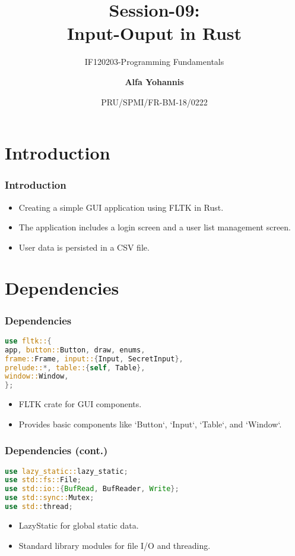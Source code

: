 \documentclass[aspectratio=169, table]{beamer}
\subtitle{IF120203-Programming Fundamentals}
\title{Session-09:\\\LARGE{Input-Ouput in Rust}\\ \vspace{10pt}}
\date[Serial]{\scriptsize {PRU/SPMI/FR-BM-18/0222}}
\author[Pradita]{\small{\textbf{Alfa Yohannis}}}
\begin{document}
\frame{\titlepage}

\begin{frame}
\tableofcontents
\end{frame}

\section{Introduction}
\begin{frame}
\frametitle{Introduction}
\begin{itemize}
\item Creating a simple GUI application using FLTK in Rust.
\item The application includes a login screen and a user list management screen.
\item User data is persisted in a CSV file.
\end{itemize}
\end{frame}

\section{Dependencies}
\begin{frame}[fragile]
\frametitle{Dependencies}
\begin{lstlisting}[language=Rust]
use fltk::{
app, button::Button, draw, enums,
frame::Frame, input::{Input, SecretInput},
prelude::*, table::{self, Table},
window::Window,
};
\end{lstlisting}
\begin{itemize}
\item FLTK crate for GUI components.
\item Provides basic components like `Button`, `Input`, `Table`, and `Window`.
\end{itemize}
\end{frame}

\begin{frame}[fragile]
\frametitle{Dependencies (cont.)}
\begin{lstlisting}[language=Rust]
use lazy_static::lazy_static;
use std::fs::File;
use std::io::{BufRead, BufReader, Write};
use std::sync::Mutex;
use std::thread;
\end{lstlisting}
\begin{itemize}
\item LazyStatic for global static data.
\item Standard library modules for file I/O and threading.
\end{itemize}
\end{frame}
\end{document}
